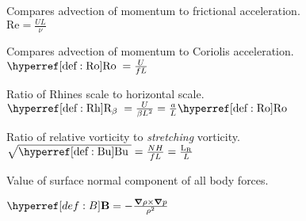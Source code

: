 \begin{multicols}{3}

\begin{definition} \label{def:Re}
Compares advection of momentum to frictional acceleration.\\
$\mathrm{Re} = \frac{U L}{\nu}$
 \end{definition}



\begin{definition} \label{def:Ro}
Compares advection of momentum to Coriolis acceleration.\\
$\Ro = \frac{U }{f L}$
 \end{definition}



\begin{definition}\label{def:Rh}
Ratio of Rhines scale to horizontal scale.\\
$\Rh = \frac{U }{\beta L^2} = \frac{a}{L} \Ro$
  \end{definition}



\begin{definition}\label{def:Bu}
Ratio of relative vorticity to \textit{stretching} vorticity.\\
$\sqrt{\Bu}=\frac{N H}{f L}=\frac{\mathrm{L_R}}{L}$
 \end{definition}


\begin{definition} \label{def:m}
\end{definition}

\begin{definition} \label{def:g}
Value of surface normal component of all body forces.
\end{definition}


\begin{definition} \label{def:vort}
\end{definition}


\begin{definition} \label{def:B }
$\B= -\frac{ \grad \rho 	\times \grad p}{ \rho^{2}} $
\end{definition}


\end{multicols}

